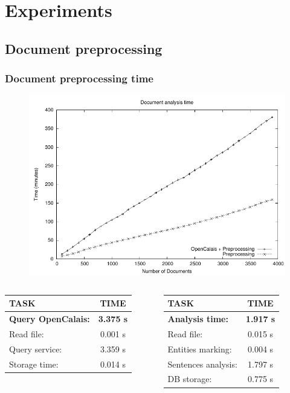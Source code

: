 \documentclass{beamer}
\begin{document}
\section{Experiments}
\subsection{Document preprocessing}

\begin{frame}
\frametitle{Document preprocessing time}
\begin{figure}
\includegraphics[scale=0.6]{imgs/analysis_time}
\end{figure}
\begin{columns}[T]
\centering
\tiny
\begin{tabular}{l|c}
TASK & TIME \\
\hline
\bf{Query OpenCalais:} & \bf{3.375 s}\\
\;\;Read file: & 0.001 s\\
\;\;Query service: & 3.359 s\\
\;\;Storage time: & 0.014 s\\
\end{tabular}
\centering
\tiny
\begin{tabular}{l|c}
TASK & TIME \\
\hline
\bf{Analysis time:} & \bf{1.917 s}\\
\;\;Read file: & 0.015 s\\
\;\;Entities marking: & 0.004 s\\
\;\;Sentences analysis: & 1.797 s\\
\;\;DB storage: & 0.775 s\\
\end{tabular}
\end{columns}
\bigskip
\end{frame}
\end{document}
